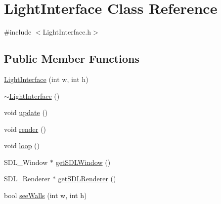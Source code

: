 \hypertarget{class_light_interface}{}\section{Light\+Interface Class Reference}
\label{class_light_interface}


{\ttfamily \#include $<$Light\+Interface.\+h$>$}

\subsection*{Public Member Functions}
\begin{DoxyCompactItemize}
\item 
\mbox{\hyperlink{class_light_interface_a619a9978f9215d6f804667b29afc528c}{Light\+Interface}} (int w, int h)
\item 
\mbox{\hyperlink{class_light_interface_a52deb9879a0cbfaca66175185a60de19}{$\sim$\+Light\+Interface}} ()
\item 
void \mbox{\hyperlink{class_light_interface_ae32d55de072694ee5eda0a1f86b07c09}{update}} ()
\item 
void \mbox{\hyperlink{class_light_interface_a481213025fc413d04ca8f951d5037763}{render}} ()
\item 
void \mbox{\hyperlink{class_light_interface_a452ed732228a1e0eb2742be917d5d0d8}{loop}} ()
\item 
S\+D\+L\+\_\+\+Window $\ast$ \mbox{\hyperlink{class_light_interface_a91bb95a1f628517f249917e380e5dacf}{get\+S\+D\+L\+Window}} ()
\item 
S\+D\+L\+\_\+\+Renderer $\ast$ \mbox{\hyperlink{class_light_interface_a7f7c944f07ba1ae77ba0e6e6bad9fbad}{get\+S\+D\+L\+Renderer}} ()
\item 
bool \mbox{\hyperlink{class_light_interface_ad283bc94f243e8b162f351eeab6b204d}{see\+Walls}} (int w, int h)
\end{DoxyCompactItemize}
